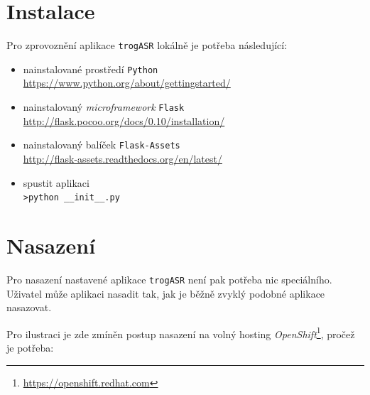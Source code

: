 \section{Instalace}

Pro zprovoznění aplikace \verb|trogASR| lokálně je potřeba následující:

\begin{itemize}
\item nainstalované prostředí \verb|Python| \\ \url{https://www.python.org/about/gettingstarted/}
\item nainstalovaný {\sl microframework} \verb|Flask| \\ \url{http://flask.pocoo.org/docs/0.10/installation/}
\item nainstalovaný balíček \verb|Flask-Assets| \\ \url{http://flask-assets.readthedocs.org/en/latest/}
\item spustit aplikaci \\ \verb|>python __init__.py|
\end{itemize}

\section{Nasazení}

Pro nasazení nastavené aplikace \verb|trogASR| není pak potřeba nic speciálního. Uživatel může aplikaci nasadit tak, jak je běžně zvyklý podobné aplikace nasazovat.

Pro ilustraci je zde zmíněn postup nasazení na volný hosting {\sl OpenShift}\footnote{\url{https://openshift.redhat.com}}, pročež je potřeba:

